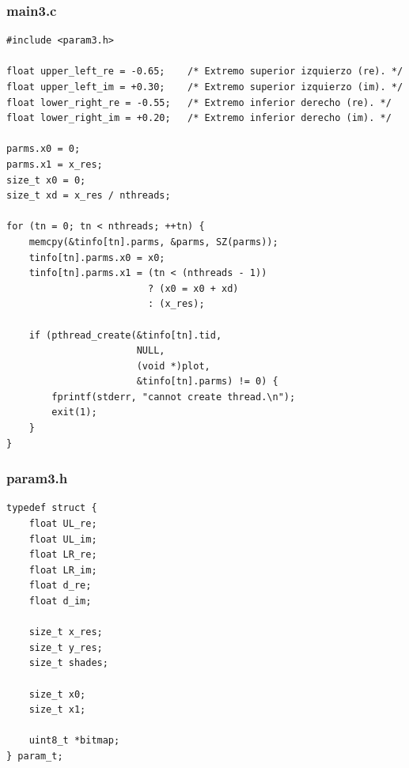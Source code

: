 \documentclass[a4paper,10pt]{article}
\begin{document}
\subsubsection{main3.c}
\begin{verbatim}
#include <param3.h>

float upper_left_re = -0.65;	/* Extremo superior izquierzo (re). */
float upper_left_im = +0.30;	/* Extremo superior izquierzo (im). */
float lower_right_re = -0.55;	/* Extremo inferior derecho (re). */
float lower_right_im = +0.20;	/* Extremo inferior derecho (im). */

parms.x0 = 0;
parms.x1 = x_res;
size_t x0 = 0;
size_t xd = x_res / nthreads;

for (tn = 0; tn < nthreads; ++tn) {
	memcpy(&tinfo[tn].parms, &parms, SZ(parms));
	tinfo[tn].parms.x0 = x0;
	tinfo[tn].parms.x1 = (tn < (nthreads - 1))
	                     ? (x0 = x0 + xd)
	                     : (x_res);

	if (pthread_create(&tinfo[tn].tid, 
	                   NULL, 
	                   (void *)plot,
	                   &tinfo[tn].parms) != 0) {
		fprintf(stderr, "cannot create thread.\n");
		exit(1);
	}
}

\end{verbatim}
\subsubsection{param3.h}
\begin{verbatim}
typedef struct {
	float UL_re;
	float UL_im;
	float LR_re;
	float LR_im;
	float d_re;
	float d_im;

	size_t x_res;
	size_t y_res;
	size_t shades;

	size_t x0;
	size_t x1;

	uint8_t *bitmap;
} param_t;
\end{verbatim}
\end{document}
